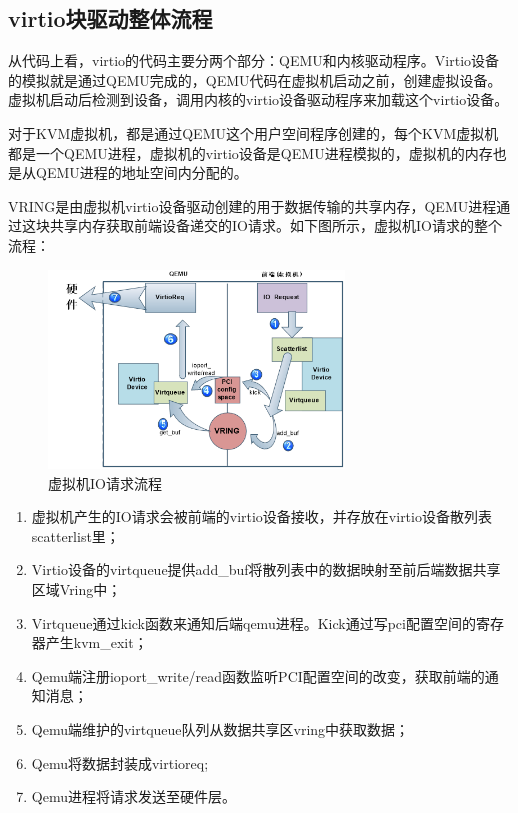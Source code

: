 \subsection{virtio块驱动整体流程}

从代码上看，virtio的代码主要分两个部分：QEMU和内核驱动程序。Virtio设备的模拟就是通过QEMU完成的，QEMU代码在虚拟机启动之前，创建虚拟设备。虚拟机启动后检测到设备，调用内核的virtio设备驱动程序来加载这个virtio设备。


对于KVM虚拟机，都是通过QEMU这个用户空间程序创建的，每个KVM虚拟机都是一个QEMU进程，虚拟机的virtio设备是QEMU进程模拟的，虚拟机的内存也是从QEMU进程的地址空间内分配的。


VRING是由虚拟机virtio设备驱动创建的用于数据传输的共享内存，QEMU进程通过这块共享内存获取前端设备递交的IO请求。如下图所示，虚拟机IO请求的整个流程：

\begin{figure}[H]
    \centering
    \includegraphics[width=0.7\textwidth]{figures/06-03-2.png}
    \caption{虚拟机IO请求流程}
\end{figure}

\begin{enumerate}
	\item 虚拟机产生的IO请求会被前端的virtio设备接收，并存放在virtio设备散列表scatterlist里；
	\item Virtio设备的virtqueue提供add\_buf将散列表中的数据映射至前后端数据共享区域Vring中；
	\item Virtqueue通过kick函数来通知后端qemu进程。Kick通过写pci配置空间的寄存器产生kvm\_exit；
	\item Qemu端注册ioport\_write/read函数监听PCI配置空间的改变，获取前端的通知消息；
	\item Qemu端维护的virtqueue队列从数据共享区vring中获取数据；
	\item Qemu将数据封装成virtioreq;
	\item Qemu进程将请求发送至硬件层。
\end{enumerate}

